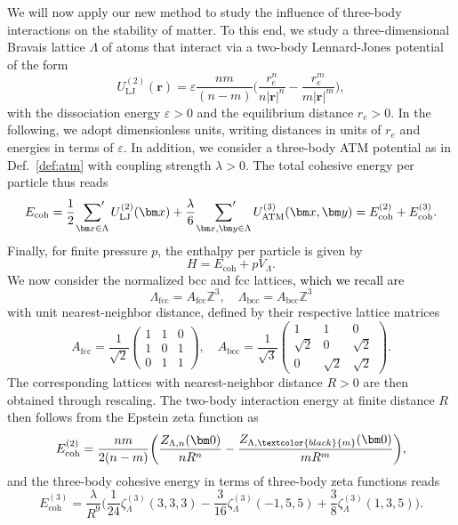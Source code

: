 \documentclass[]{amsart}
\numberwithin{mythm}{section}
\newcommand{\new}[1]{{\textcolor{black}{#1}}}
\begin{document}
We will now apply our new method to study the influence of three-body interactions on the stability of matter. To this end, we study a three-dimensional Bravais lattice $\Lambda$ of atoms that interact via a two-body Lennard-Jones potential  of the form \cite{schwerdtfeger2024onehundred}
\[
U^{(2)}_{\mathrm{LJ}}(\bm r) = \varepsilon\frac{nm}{(n-m)}\bigg(\frac{r_e^n}{n \vert \bm r\vert^n}-\frac{r_e^m}{m \vert \bm r\vert^{m}} \bigg),
\]
with the dissociation energy $\varepsilon>0$ and the equilibrium distance $r_e>0$. In the following, we adopt dimensionless units, writing distances in units of $r_e$ and energies in terms of $\varepsilon$. In addition, we consider a three-body ATM potential as in Def.~\ref{def:atm} with coupling strength $\lambda>0$. The total cohesive energy per particle thus reads
\[
E_\mathrm{coh} = \frac{1}{2}\,\sideset{}{'}\sum_{\bm x\in \Lambda}U^{(2)}_{\mathrm{LJ}}(\bm x)+\frac{\lambda}{6}\,\sideset{}{'}\sum_{\bm x,\bm y\in \Lambda}U^{(3)}_\mathrm{ATM}(\bm x,\bm y) =E_\mathrm{coh}^{(2)}+ E_\mathrm{coh}^{(3)}.
\]
Finally, for finite pressure $p$, the enthalpy per particle is given by
\begin{equation*}
H=E_\mathrm{coh}+pV_\Lambda.
\end{equation*}
We now consider the normalized bcc and fcc lattices\new{, which we recall are} 
\[
\Lambda_\mathrm{fcc}=A_\mathrm{fcc} \mathds Z^3,\quad \Lambda_\mathrm{bcc}=A_\mathrm{bcc}\mathds Z^3
\] with unit nearest-neighbor distance, defined by their respective lattice matrices 
\[
A_\mathrm{fcc}=\frac{1}{\sqrt{2}} \begin{pmatrix}
    1 & 1 & 0\\
    1 & 0 & 1\\
    0 & 1 & 1
\end{pmatrix},\quad A_\mathrm{bcc}=\frac{1}{\sqrt{3}} \begin{pmatrix}
    1 & 1 & 0\\
    \sqrt{2} & 0 & \sqrt{2}\\
    0 & \sqrt{2} & \sqrt{2}
\end{pmatrix}.
\]
The corresponding lattices with nearest-neighbor distance $R>0$ are then obtained through rescaling. The two-body interaction energy at finite distance $R$ then follows from the Epstein zeta function as 
\[
E_\mathrm{coh}^{(2)} = \frac{nm}{2(n-m)}\bigg(\frac{Z_{\Lambda,n}(\bm 0)}{n R^n }-\frac{Z_{\Lambda,\new{m}}(\bm 0)}{m R^m} \bigg),
\]
and the three-body cohesive energy in terms of three-body zeta functions reads
\[
E_\mathrm{coh}^{(3)}=\frac{\lambda}{R^9}\bigg(\frac{1}{24}\zeta_\Lambda^{(3)}(3,3,3) - \frac{3}{16} \zeta_\Lambda^{(3)}(-1,5,5)+\frac{3}{8} \zeta_\Lambda^{(3)}(1,3,5)\bigg).
\]
\end{document}
